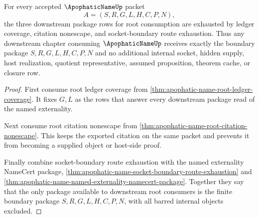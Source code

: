 \begin{theorem}
\label{thm:apophatic-name-root-boundary-package-exhaustion}
For every accepted $\ApophaticNameUp$ packet
$$
A=(S,R,G,L,H,C,P,N),
$$
the three downstream package rows for root consumption are exhausted by ledger coverage, citation nonescape, and socket-boundary route exhaustion. Thus any downstream chapter consuming $\ApophaticNameUp$ receives exactly the boundary package $S,R,G,L,H,C,P,N$ and no additional internal socket, hidden supply, host realization, quotient representative, assumed proposition, theorem cache, or closure row.
\end{theorem}
\begin{proof}
First consume root ledger coverage from \autoref{thm:apophatic-name-root-ledger-coverage}. It fixes $G,L$ as the rows that answer every downstream package read of the named externality.

Next consume root citation nonescape from \autoref{thm:apophatic-name-root-citation-nonescape}. This keeps the exported citation on the same packet and prevents it from becoming a supplied object or host-side proof.

Finally combine socket-boundary route exhaustion with the named externality NameCert package, \autoref{thm:apophatic-name-socket-boundary-route-exhaustion} and \autoref{thm:apophatic-name-named-externality-namecert-package}. Together they say that the only package available to downstream root consumers is the finite boundary package $S,R,G,L,H,C,P,N$, with all barred internal objects excluded.
\end{proof}




